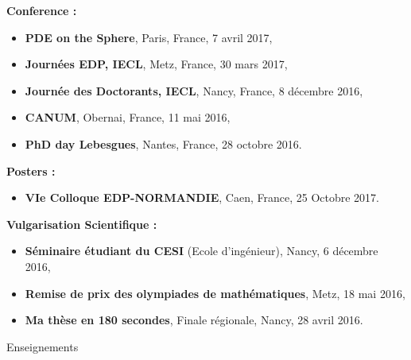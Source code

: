 \documentclass[10pt,a4paper]{report}
\begin{document}
\vspace{0.3cm}
\noindent
{\selectfont
\textbf{Conference :}
}

\begin{itemize}
\item \textbf{PDE on the Sphere}, Paris, France, 7 avril 2017,
\item \textbf{Journées EDP, IECL}, Metz, France, 30 mars 2017,
\item \textbf{Journée des Doctorants, IECL}, Nancy, France, 8 décembre 2016,
\item \textbf{CANUM}, Obernai, France, 11 mai 2016,
\item \textbf{PhD day Lebesgues}, Nantes, France, 28 octobre 2016.
\end{itemize}

\vspace{0.3cm}
\noindent
{\selectfont
\textbf{Posters :}
}

\begin{itemize}
\item \textbf{VIe Colloque EDP-NORMANDIE}, Caen, France, 25 Octobre 2017.
\end{itemize}

\vspace{0.3cm}
\noindent
{\selectfont
\textbf{Vulgarisation Scientifique :}
}
\begin{itemize}
\item \textbf{Séminaire étudiant du CESI }(Ecole d'ingénieur), Nancy, 6 décembre 2016,
\item \textbf{Remise de prix des olympiades de mathématiques}, Metz, 18 mai 2016,
\item \textbf{Ma thèse en 180 secondes}, Finale régionale, Nancy, 28 avril 2016.
\end{itemize}

\vspace{.5cm}
\noindent
{\selectfont
\begin{Large}
Enseignements
\end{Large}
\hrulefill
}
\end{document}
